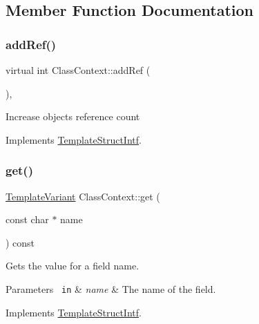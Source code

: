 \subsection{Member Function Documentation}
\mbox{\label{class_class_context_acb15feacf639082eca1d686f54dec3db}} 
\subsubsection{\texorpdfstring{addRef()}{addRef()}}
{\footnotesize\ttfamily virtual int Class\+Context\+::add\+Ref (\begin{DoxyParamCaption}{ }\end{DoxyParamCaption})\hspace{0.3cm}{\ttfamily [inline]}, {\ttfamily [virtual]}}

Increase object\textquotesingle{}s reference count 

Implements \mbox{\hyperlink{class_template_struct_intf_a05fe97ad47633beb326f69686faed581}{Template\+Struct\+Intf}}.

\mbox{\label{class_class_context_a7826818c79646d8fcdadfcab5f1c2cc5}} 
\subsubsection{\texorpdfstring{get()}{get()}}
{\footnotesize\ttfamily \mbox{\hyperlink{class_template_variant}{Template\+Variant}} Class\+Context\+::get (\begin{DoxyParamCaption}\item[{const char $\ast$}]{name }\end{DoxyParamCaption}) const\hspace{0.3cm}{\ttfamily [virtual]}}

Gets the value for a field name. 
\begin{DoxyParams}[1]{Parameters}
\mbox{\texttt{ in}}  & {\em name} & The name of the field. \\
\hline
\end{DoxyParams}


Implements \mbox{\hyperlink{class_template_struct_intf_a3d610cb81b4adbb531ebed3aa3d09b51}{Template\+Struct\+Intf}}.

\mbox{\label{class_class_context_a0be571acb1fbb5bf559fda7daad05a36}} 
